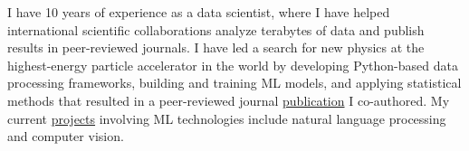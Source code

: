 I have 10 years of experience as a data scientist, where I have helped international scientific collaborations analyze terabytes of data and publish results in peer-reviewed journals. I have led a search for new physics at the highest-energy particle accelerator in the world by developing Python-based data processing frameworks, building and training ML models, and applying statistical methods that resulted in a peer-reviewed journal \href{https://journals.aps.org/prd/pdf/10.1103/PhysRevD.109.112003}{publication} I co-authored. My current \href{https://github.com/gmadigan/DataProjects}{projects} involving ML technologies include natural language processing and computer vision.


